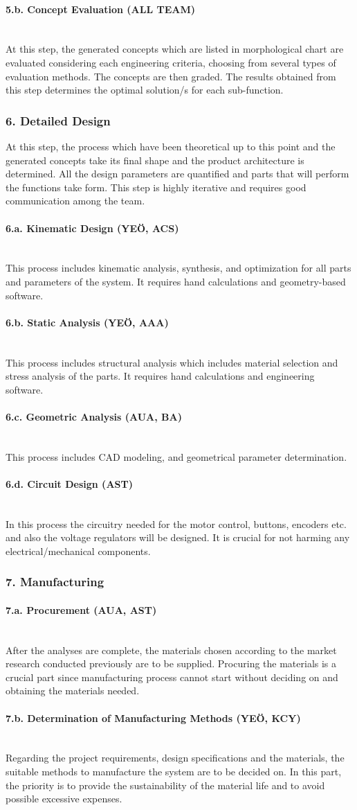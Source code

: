 \documentclass[12pt]{article}
\newcommand{\paragraphs}[1]{\paragraph*{#1}\mbox{}\\}
\begin{document}
\paragraphs{5.b. Concept Evaluation (ALL TEAM)}
At this step, the generated concepts which are listed in morphological chart are evaluated considering each engineering criteria, choosing from several types of evaluation methods. The concepts are then graded. The results obtained from this step determines the optimal solution/s for each sub-function.

\subsubsection*{6. Detailed Design}
At this step, the process which have been theoretical up to this point and the generated concepts take its final shape and the product architecture is determined. All the design parameters are quantified and parts that will perform the functions take form. This step is highly iterative and requires good communication among the team.

\paragraphs{6.a. Kinematic Design (YEÖ, ACS)}
This process includes kinematic analysis, synthesis, and optimization for all parts and parameters of the system. It requires hand calculations and geometry-based software.
\paragraphs{6.b. Static Analysis (YEÖ, AAA)}
 This process includes structural analysis which includes material selection and stress analysis of the parts. It requires hand calculations and engineering software. 
 
\paragraphs{6.c. Geometric Analysis (AUA, BA)} 
This process includes CAD modeling, and geometrical parameter determination. 
\paragraphs{6.d. Circuit Design (AST)}
In this process the circuitry needed for the motor control, buttons, encoders etc. and also the voltage regulators will be designed. It is crucial for not harming any electrical/mechanical components.


\subsubsection*{7. Manufacturing}
\paragraphs{7.a. Procurement (AUA, AST)}
After the analyses are complete, the materials chosen according to the market research conducted previously are to be supplied. Procuring the materials is a crucial part since manufacturing process cannot start without deciding on and obtaining the materials needed. 

\paragraphs{7.b. Determination of Manufacturing Methods (YEÖ, KCY)}
Regarding the project requirements, design specifications and the materials, the suitable methods to manufacture the system are to be decided on. In this part, the priority is to provide the sustainability of the material life and to avoid possible excessive expenses.   
\end{document}
